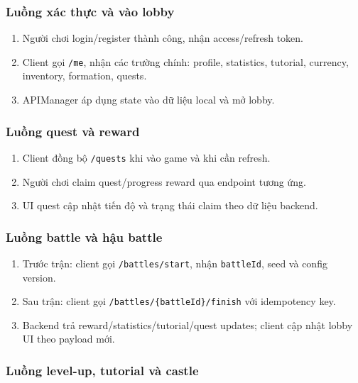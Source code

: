 \subsubsection{Luồng xác thực và vào lobby}
\label{subsubsec:impl-flow-auth}

\begin{enumerate}
    \item Người chơi login/\allowbreak register thành công, nhận access/\allowbreak refresh token.
    \item Client gọi \texttt{/me}, nhận các trường chính: profile, statistics, tutorial, currency, inventory, formation, quests.
    \item APIManager áp dụng state vào dữ liệu local và mở lobby.
\end{enumerate}

\subsubsection{Luồng quest và reward}
\label{subsubsec:impl-flow-quest}

\begin{enumerate}
    \item Client đồng bộ \texttt{/quests} khi vào game và khi cần refresh.
    \item Người chơi claim quest/progress reward qua endpoint tương ứng.
    \item UI quest cập nhật tiến độ và trạng thái claim theo dữ liệu backend.
\end{enumerate}

\subsubsection{Luồng battle và hậu battle}
\label{subsubsec:impl-flow-battle}

\begin{enumerate}
    \item Trước trận: client gọi \texttt{/battles/start}, nhận \texttt{battleId}, seed và config version.
    \item Sau trận: client gọi \texttt{/battles/\{battleId\}/finish} với idempotency key.
    \item Backend trả reward/\allowbreak statistics/\allowbreak tutorial/\allowbreak quest updates; client cập nhật lobby UI theo payload mới.
\end{enumerate}

\subsubsection{Luồng level-up, tutorial và castle}
\label{subsubsec:impl-flow-progression}

